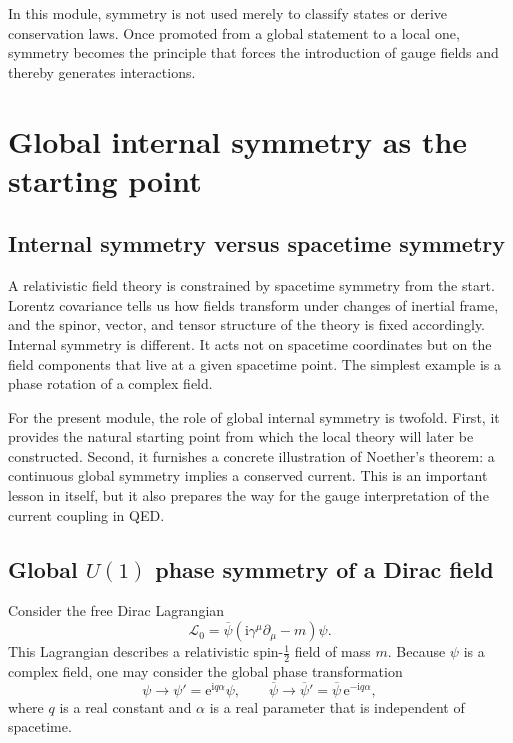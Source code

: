 \documentclass[11pt,a4paper]{article}
\newcommand{\Lag}{\mathcal{L}}
\newcommand{\ii}{\mathrm{i}}
\newcommand{\ee}{\mathrm{e}}
\newcommand{\p}{\partial}
\newcommand{\half}{\tfrac12}
\newcommand{\gmu}{\gamma^\mu}
\newcommand{\psibar}{\overline{\psi}}
\begin{document}
\begin{takehomebox}
\vspace{0.25cm}
In this module, symmetry is not used merely to classify states or derive conservation laws. Once promoted from a global statement to a local one, symmetry becomes the principle that forces the introduction of gauge fields and thereby generates interactions.
\end{takehomebox}




\section{Global internal symmetry as the starting point}


\subsection{Internal symmetry versus spacetime symmetry}


A relativistic field theory is constrained by spacetime symmetry from the start. Lorentz covariance tells us how fields transform under changes of inertial frame, and the spinor, vector, and tensor structure of the theory is fixed accordingly. Internal symmetry is different. It acts not on spacetime coordinates but on the field components that live at a given spacetime point. The simplest example is a phase rotation of a complex field.

For the present module, the role of global internal symmetry is twofold. First, it provides the natural starting point from which the local theory will later be constructed. Second, it furnishes a concrete illustration of Noether's theorem: a continuous global symmetry implies a conserved current. This is an important lesson in itself, but it also prepares the way for the gauge interpretation of the current coupling in QED.

\subsection{Global \texorpdfstring{$U(1)$}{U(1)} phase symmetry of a Dirac field}

Consider the free Dirac Lagrangian
\begin{equation}
\Lag_0 = \psibar(\ii\gmu\p_\mu-m)\psi.
\label{eq:free-dirac-lagrangian-expanded}
\end{equation}
This Lagrangian describes a relativistic spin-\(\half\) field of mass \(m\). Because \(\psi\) is a complex field, one may consider the global phase transformation
\begin{equation}
\psi \longrightarrow \psi' = \ee^{\ii q\alpha}\psi,
\qquad
\psibar \longrightarrow \psibar' = \psibar\,\ee^{-\ii q\alpha},
\label{eq:global-u1-expanded}
\end{equation}
where \(q\) is a real constant and \(\alpha\) is a real parameter that is independent of spacetime.
\end{document}
